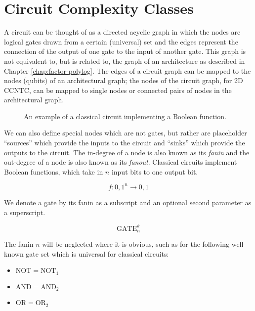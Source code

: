 \section{Circuit Complexity Classes}
\label{sec:fsl-circuits}

A circuit can be thought of as a directed acyclic graph in which the nodes are
logical gates drawn from a certain (universal) set and the edges 
represent
the connection of the output of one gate to the input of another
gate. This graph is not equivalent to, but is related to, the graph of an architecture
as described in Chapter \ref{chap:factor-polylog}. The edges of a circuit graph can
be mapped to the nodes (qubits) of an architectural graph; the nodes of the
circuit graph, for 2D CCNTC, can be mapped to single nodes or connected pairs of nodes
in the architectural graph.

\begin{figure}
\caption{An example of a classical circuit implementing a Boolean function.}
\end{figure}

We can also define special nodes which are not gates, but rather
are placeholder ``sources'' which provide the inputs to the circuit and 
``sinks'' which provide the outputs to the circuit. The in-degree of a 
node is also known as its \emph{fanin} and the out-degree of a node is
also known as its \emph{fanout}.
Classical circuits implement Boolean functions, which take in $n$ input
bits to one output bit.

\begin{equation}
f:{0,1}^n \rightarrow {0,1}
\end{equation}

We denote a gate by its fanin as a subscript and an optional
second parameter as a superscript.

\begin{equation}
\text{GATE}_n^k
\end{equation}

The fanin $n$ will be neglected where it is obvious,
such as for the following well-known gate set which is universal
for classical circuits:

\begin{itemize}
\item $\text{NOT} = \text{NOT}_1$
\item $\text{AND} = \text{AND}_2$
\item $\text{OR} = \text{OR}_2$
\end{itemize}

